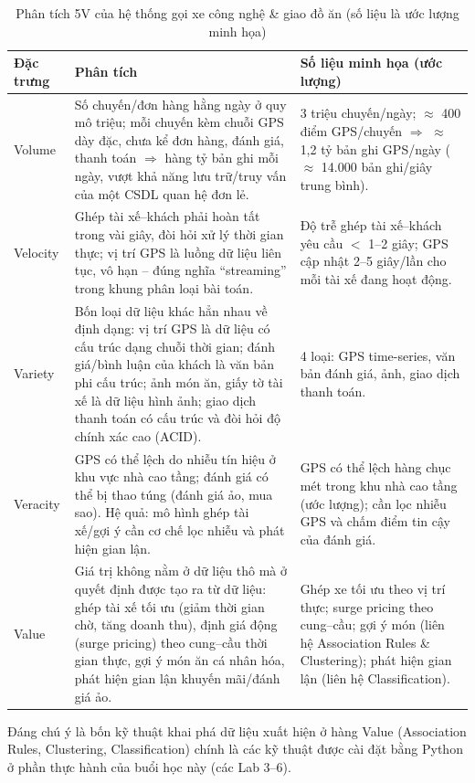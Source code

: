 \documentclass[12pt,a4paper,oneside]{article}
\begin{document}
\begin{table}[H]
\centering
\caption{Phân tích 5V của hệ thống gọi xe công nghệ \& giao đồ ăn (số liệu là ước lượng minh họa)}
\label{tab:5v-casestudy}
\begin{tabularx}{\textwidth}{l X X}
\toprule
Đặc trưng & Phân tích & Số liệu minh họa (ước lượng) \\
\midrule
Volume & Số chuyến/đơn hàng hằng ngày ở quy mô triệu; mỗi chuyến kèm chuỗi GPS dày đặc, chưa kể đơn hàng, đánh giá, thanh toán $\Rightarrow$ hàng tỷ bản ghi mỗi ngày, vượt khả năng lưu trữ/truy vấn của một CSDL quan hệ đơn lẻ. & 3 triệu chuyến/ngày; $\approx$ 400 điểm GPS/chuyến $\Rightarrow$ $\approx$ 1,2 tỷ bản ghi GPS/ngày ($\approx$ 14.000 bản ghi/giây trung bình). \\
Velocity & Ghép tài xế--khách phải hoàn tất trong vài giây, đòi hỏi xử lý thời gian thực; vị trí GPS là luồng dữ liệu liên tục, vô hạn -- đúng nghĩa ``streaming'' trong khung phân loại bài toán. & Độ trễ ghép tài xế--khách yêu cầu $<$ 1--2 giây; GPS cập nhật 2--5 giây/lần cho mỗi tài xế đang hoạt động. \\
Variety & Bốn loại dữ liệu khác hẳn nhau về định dạng: vị trí GPS là dữ liệu có cấu trúc dạng chuỗi thời gian; đánh giá/bình luận của khách là văn bản phi cấu trúc; ảnh món ăn, giấy tờ tài xế là dữ liệu hình ảnh; giao dịch thanh toán có cấu trúc và đòi hỏi độ chính xác cao (ACID). & 4 loại: GPS time-series, văn bản đánh giá, ảnh, giao dịch thanh toán. \\
Veracity & GPS có thể lệch do nhiễu tín hiệu ở khu vực nhà cao tầng; đánh giá có thể bị thao túng (đánh giá ảo, mua sao). Hệ quả: mô hình ghép tài xế/gợi ý cần cơ chế lọc nhiễu và phát hiện gian lận. & GPS có thể lệch hàng chục mét trong khu nhà cao tầng (ước lượng); cần lọc nhiễu GPS và chấm điểm tin cậy của đánh giá. \\
Value & Giá trị không nằm ở dữ liệu thô mà ở quyết định được tạo ra từ dữ liệu: ghép tài xế tối ưu (giảm thời gian chờ, tăng doanh thu), định giá động (surge pricing) theo cung--cầu thời gian thực, gợi ý món ăn cá nhân hóa, phát hiện gian lận khuyến mãi/đánh giá ảo. & Ghép xe tối ưu theo vị trí thực; surge pricing theo cung--cầu; gợi ý món (liên hệ Association Rules \& Clustering); phát hiện gian lận (liên hệ Classification). \\
\bottomrule
\end{tabularx}
\end{table}

Đáng chú ý là bốn kỹ thuật khai phá dữ liệu xuất hiện ở hàng Value (Association Rules, Clustering, Classification) chính là các kỹ thuật được cài đặt bằng Python ở phần thực hành của buổi học này (các Lab 3--6).
\end{document}
